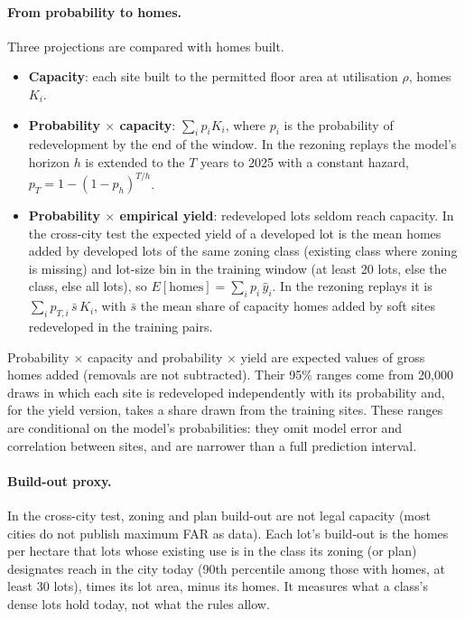 \documentclass[10pt]{article}
\begin{document}
\paragraph{From probability to homes.} Three projections are compared with homes built.
\begin{itemize}
\item \textbf{Capacity}: each site built to the permitted floor area at utilisation $\rho$, homes $K_i$.
\item \textbf{Probability $\times$ capacity}: $\sum_i p_i K_i$, where $p_i$ is the probability of redevelopment by the
end of the window. In the rezoning replays the model's horizon $h$ is extended to the $T$ years to 2025 with a
constant hazard, $p_T = 1 - (1-p_h)^{T/h}$.
\item \textbf{Probability $\times$ empirical yield}: redeveloped lots seldom reach capacity. In the cross-city test the
expected yield of a developed lot is the mean homes added by developed lots of the same zoning class (existing class
where zoning is missing) and lot-size bin in the training window (at least 20 lots, else the class, else all lots), so $E[\text{homes}] = \sum_i p_i\,\hat y_i$. In the
rezoning replays it is $\sum_i p_{T,i}\,\bar s\,K_i$, with $\bar s$ the mean share of capacity homes added by soft sites
redeveloped in the training pairs.
\end{itemize}
Probability $\times$ capacity and probability $\times$ yield are expected values of gross homes added (removals are not
subtracted). Their 95\% ranges come from 20,000 draws in which each site is redeveloped independently with its
probability and, for the yield version, takes a share drawn from the training sites. These ranges are conditional on
the model's probabilities: they omit model error and correlation between sites, and are narrower than a full
prediction interval.

\paragraph{Build-out proxy.} In the cross-city test, zoning and plan build-out are not legal capacity (most cities do
not publish maximum FAR as data). Each lot's build-out is the homes per hectare that lots whose existing use is in the class its zoning (or
plan) designates reach in the city today (90th percentile among those with homes, at least 30 lots), times its lot
area, minus its homes. It measures what a class's dense lots hold today, not what the rules allow.
\end{document}
